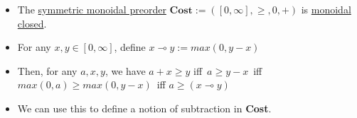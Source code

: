 \begin{itemize}
    \item The \href{doc/1 math/Seven Sketches in Compositionality/Chapter 2: Resource theories/2 Symmetric monoidal preorders/1 Definition and first examples/1 Symmetric monoidal structure on a preorder}{symmetric monoidal preorder} $\mathbf{Cost}:=([0,\infty],\geq,0,+)$ is \href{doc/1 math/Seven Sketches in Compositionality/Chapter 2: Resource theories/5 Computing presented V-categories with matrix mult/1 Monoidal closed preorders/1 Closed SMP}{monoidal closed}.
    \item For any $x,y \in [0,\infty]$, define $x \multimap y := max(0,y-x)$
    \item Then, for any $a,x,y$, we have $a+x\geq y$ iff \,$a \geq y-x$\, iff \,$max(0,a)\geq max(0,y-x)$\, iff $a \geq (x \multimap y)$
    \item We can use this to define a notion of subtraction in \textbf{Cost}.
  \end{itemize}